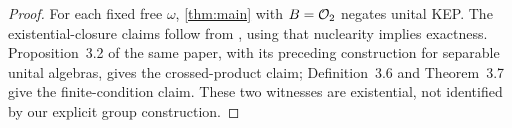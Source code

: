 \begin{proof}
For each fixed free $\omega$, \cref{thm:main} with $B=\mathcal O_2$ negates
unital KEP. The existential-closure claims follow from
\cite[Theorem~3.3]{GoldbringSinclair2015}, using that nuclearity implies
exactness. Proposition~3.2 of the same
paper, with its preceding construction for separable unital algebras,
gives the crossed-product claim; Definition~3.6 and Theorem~3.7 give
the finite-condition claim. These two witnesses are existential,
not identified by our explicit group construction.
\end{proof}


